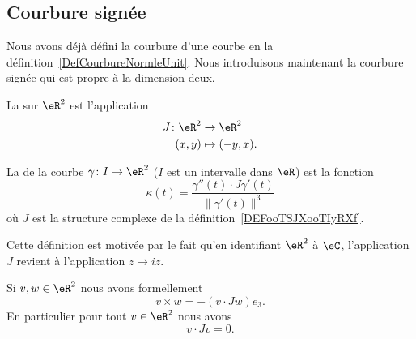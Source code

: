 \subsection{Courbure signée}

Nous avons déjà défini la courbure d'une courbe en la définition~\ref{DefCourbureNormleUnit}. Nous introduisons maintenant la courbure signée qui est propre à la dimension deux.

\begin{definition}      \label{DEFooTSJXooTIyRXf}
	La  sur \( \eR^2\) est l'application
	\begin{equation}
		\begin{aligned}
			J\colon \eR^2 & \to \eR^2       \\
			(x,y)         & \mapsto (-y,x).
		\end{aligned}
	\end{equation}
\end{definition}

\begin{definition}      \label{DEFooJFWEooXcIVUs}
	La  de la courbe \( \gamma\colon I\to \eR^2\) (\( I\) est un intervalle dans \( \eR\)) est la fonction
	\begin{equation}        \label{EQooWOUQooXrVzGx}
		\kappa(t)=\frac{ \gamma''(t)\cdot J\gamma'(t) }{ \| \gamma'(t) \|^3 }
	\end{equation}
	où \( J\) est la structure complexe de la définition~\ref{DEFooTSJXooTIyRXf}.
\end{definition}
Cette définition est motivée par le fait qu'en identifiant \( \eR^2\) à \( \eC\), l'application \( J\) revient à l'application \( z\mapsto iz\).

Si \( v,w\in \eR^2\) nous avons formellement
\begin{equation}
	v\times w=-(v\cdot Jw)e_3.
\end{equation}
En particulier pour tout \( v\in \eR^2\) nous avons
\begin{equation}
	v\cdot Jv=0.
\end{equation}

